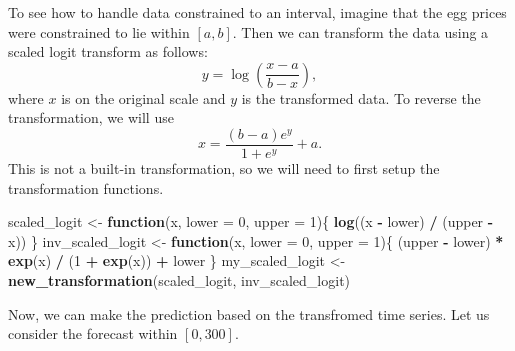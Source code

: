 \documentclass[]{book}
\newenvironment{Shaded}{\begin{snugshade}}{\end{snugshade}}
\newcommand{\KeywordTok}[1]{\textcolor[rgb]{0.13,0.29,0.53}{\textbf{#1}}}
\newcommand{\DataTypeTok}[1]{\textcolor[rgb]{0.13,0.29,0.53}{#1}}
\newcommand{\DecValTok}[1]{\textcolor[rgb]{0.00,0.00,0.81}{#1}}
\newcommand{\StringTok}[1]{\textcolor[rgb]{0.31,0.60,0.02}{#1}}
\newcommand{\ControlFlowTok}[1]{\textcolor[rgb]{0.13,0.29,0.53}{\textbf{#1}}}
\newcommand{\OperatorTok}[1]{\textcolor[rgb]{0.81,0.36,0.00}{\textbf{#1}}}
\newcommand{\NormalTok}[1]{#1}
\begin{document}
To see how to handle data constrained to an interval, imagine that the
egg prices were constrained to lie within \([a,b]\). Then we can
transform the data using a scaled logit transform as follows:\\
\[
y=\log\left(\frac{x-a}{b-x}\right),
\] where \(x\) is on the original scale and \(y\) is the transformed
data. To reverse the transformation, we will use \[
x=\frac{(b-a)e^y}{1+e^y}+a.
\] This is not a built-in transformation, so we will need to first setup
the transformation functions.

\begin{Shaded}
\begin{Highlighting}[]
\NormalTok{scaled_logit <-}\StringTok{ }\ControlFlowTok{function}\NormalTok{(x, }\DataTypeTok{lower =} \DecValTok{0}\NormalTok{, }\DataTypeTok{upper =} \DecValTok{1}\NormalTok{)\{}
  \KeywordTok{log}\NormalTok{((x }\OperatorTok{-}\StringTok{ }\NormalTok{lower) }\OperatorTok{/}\StringTok{ }\NormalTok{(upper }\OperatorTok{-}\StringTok{ }\NormalTok{x))}
\NormalTok{\}}
\NormalTok{inv_scaled_logit <-}\StringTok{ }\ControlFlowTok{function}\NormalTok{(x, }\DataTypeTok{lower =} \DecValTok{0}\NormalTok{, }\DataTypeTok{upper =} \DecValTok{1}\NormalTok{)\{}
\NormalTok{  (upper }\OperatorTok{-}\StringTok{ }\NormalTok{lower) }\OperatorTok{*}\StringTok{ }\KeywordTok{exp}\NormalTok{(x) }\OperatorTok{/}\StringTok{ }\NormalTok{(}\DecValTok{1} \OperatorTok{+}\StringTok{ }\KeywordTok{exp}\NormalTok{(x)) }\OperatorTok{+}\StringTok{ }\NormalTok{lower}
\NormalTok{\}}
\NormalTok{my_scaled_logit <-}\StringTok{ }\KeywordTok{new_transformation}\NormalTok{(scaled_logit, inv_scaled_logit)}
\end{Highlighting}
\end{Shaded}

Now, we can make the prediction based on the transfromed time series.
Let us consider the forecast within \([0,300]\).

\begin{Shaded}
\end{Shaded}
\end{document}
